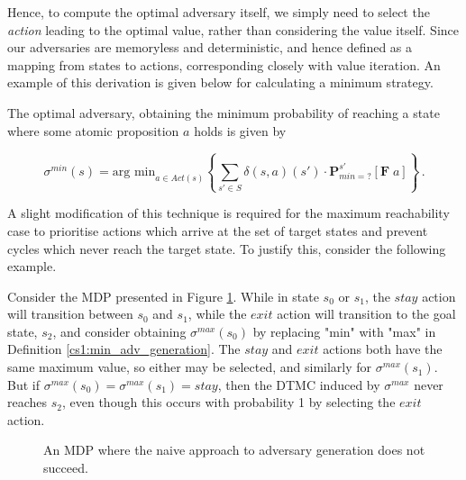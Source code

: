 Hence, to compute the optimal adversary itself, we simply need to select the \emph{action} leading to the optimal value, rather than considering the value itself. Since our adversaries are memoryless and deterministic, and hence defined as a mapping from states to actions, corresponding closely with value iteration. An example of this derivation is given below for calculating a minimum strategy.

\begin{definition}
\label{cs1:min_adv_generation}

The optimal adversary, obtaining the minimum probability of reaching a state where some atomic proposition $a$ holds is given by

\begin{equation*}
    \sigma^{min}(s) = \text{arg min}_{a \in Act(s)} \left\{ \mbox{$\sum_{s' \in S}$} \delta(s, a)(s') \cdot \mathbf{P}^{s'}_{min =?} [\mathbf{F} \; a]\right\} \, .
\end{equation*}

\end{definition}

A slight modification of this technique is required for the maximum reachability case to prioritise actions which arrive at the set of target states and prevent cycles which never reach the target state. To justify this, consider the following example.

\begin{example}
\label{cs1:bad_valit_example}

Consider the MDP presented in Figure \ref{cs1:bad_mdp_figure}. While in state $s_0$ or $s_1$, the $stay$ action will transition between $s_0$ and $s_1$, while the $exit$ action will transition to the goal state, $s_2$, and consider obtaining $\sigma^{max}(s_0)$ by replacing "min" with "max" in Definition \ref{cs1:min_adv_generation}. The $stay$ and $exit$ actions both have the same maximum value, so either may be selected, and similarly for $\sigma^{max}(s_1)$. But if $\sigma^{max}(s_0) = \sigma^{max}(s_1) = stay$, then the DTMC induced by $\sigma^{max}$ never reaches $s_2$, even though this occurs with probability 1 by selecting the $exit$ action.
\begin{figure}

\centering
{}
\caption{An MDP where the naive approach to adversary generation does not succeed.}
\label{cs1:bad_mdp_figure}
\end{figure}
\end{example}

